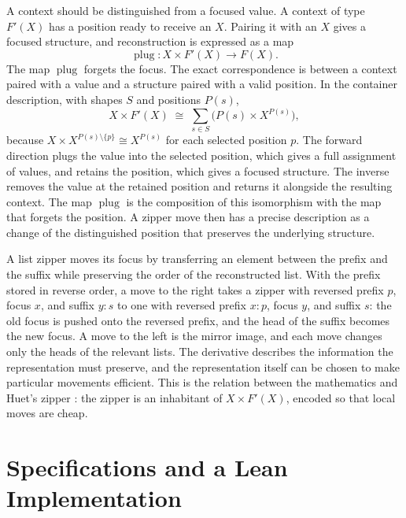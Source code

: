 \documentclass[11pt]{article}
\newcommand{\plug}{\operatorname{plug}}
\begin{document}
A context should be distinguished from a focused value. A context of type $F'(X)$ has a position ready to receive an $X$. Pairing it with an $X$ gives a focused structure, and reconstruction is expressed as a map
\[
\plug\colon X\times F'(X)\longrightarrow F(X).
\]
The map $\plug$ forgets the focus. The exact correspondence is between a context paired with a value and a structure paired with a valid position. In the container description, with shapes $S$ and positions $P(s)$,
\[
X\times F'(X)\;\cong\;\sum_{s\in S}\bigl(P(s)\times X^{P(s)}\bigr),
\]
because $X\times X^{P(s)\setminus\{p\}}\cong X^{P(s)}$ for each selected position $p$. The forward direction plugs the value into the selected position, which gives a full assignment of values, and retains the position, which gives a focused structure. The inverse removes the value at the retained position and returns it alongside the resulting context. The map $\plug$ is the composition of this isomorphism with the map that forgets the position. A zipper move then has a precise description as a change of the distinguished position that preserves the underlying structure.

A list zipper moves its focus by transferring an element between the prefix and the suffix while preserving the order of the reconstructed list. With the prefix stored in reverse order, a move to the right takes a zipper with reversed prefix $p$, focus $x$, and suffix $y{:}s$ to one with reversed prefix $x{:}p$, focus $y$, and suffix $s$: the old focus is pushed onto the reversed prefix, and the head of the suffix becomes the new focus. A move to the left is the mirror image, and each move changes only the heads of the relevant lists. The derivative describes the information the representation must preserve, and the representation itself can be chosen to make particular movements efficient. This is the relation between the mathematics and Huet's zipper \cite{huet1997}: the zipper is an inhabitant of $X\times F'(X)$, encoded so that local moves are cheap.

\section{Specifications and a Lean Implementation}
\end{document}
